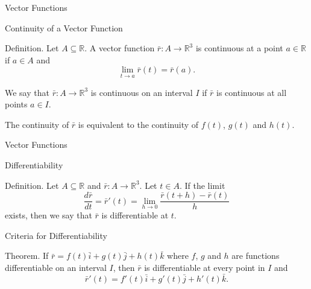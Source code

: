 \documentclass[aspectratio=169, UTF8]{ctexbeamer}
\begin{document}
    \begin{frame}[t]{Vector Functions}
        \begin{block}{Continuity of a Vector Function}
            \par \textcolor{yy}{Definition.} Let $A \subseteq \mathbb{R}$. A vector function $\bar{r}: A \to \mathbb{R}^3$ is \textcolor{yy}{continuous} at a point $a \in \mathbb{R}$ if $a \in A$ and 
            \begin{equation*}
                \lim\limits_{t \to a}\bar{r} (t) = \bar{r} (a).
            \end{equation*}

            \phantom{zjy}

            \par We say that $\bar{r}: A \to \mathbb{R}^3$ is \textcolor{yy}{continuous on an interval} $I$ if $\bar{r}$ is continuous at all points $a \in I$.
            \par The continuity of $\bar{r}$ is equivalent to the continuity of $f(t)$, $g(t)$ and $h(t)$.
        \end{block}
    \end{frame}

    \begin{frame}[t]{Vector Functions}
        \begin{block}{Differentiability}
            \par \textcolor{yy}{Definition.} Let $A \subseteq \mathbb{R}$ and $\bar{r}: A \to \mathbb{R}^3$. Let $t \in A$. If the limit
            \begin{equation*}
                \dfrac{d \bar{r}}{dt} = \bar{r}'(t) = \lim\limits_{h \to 0} \dfrac{\bar{r}(t+h) - \bar{r}(t)}{h}
            \end{equation*}
            exists, then we say that $\bar{r}$ is \textcolor{yy}{differentiable} at $t$.
        \end{block}

        \begin{block}{Criteria for Differentiability}
            \par \textcolor{yy}{Theorem.} If $\bar{r} = f(t) \bar{i} + g(t) \bar{j} + h(t) \bar{k}$ where $f$, $g$ and $h$ are functions differentiable on an interval $I$, then $\bar{r}$ is differentiable at every point in $I$ and 
            \begin{equation*}
                \bar{r}'(t) = f'(t) \bar{i} + g'(t) \bar{j} + h'(t) \bar{k} .
            \end{equation*}
        \end{block}
    \end{frame}
\end{document}
